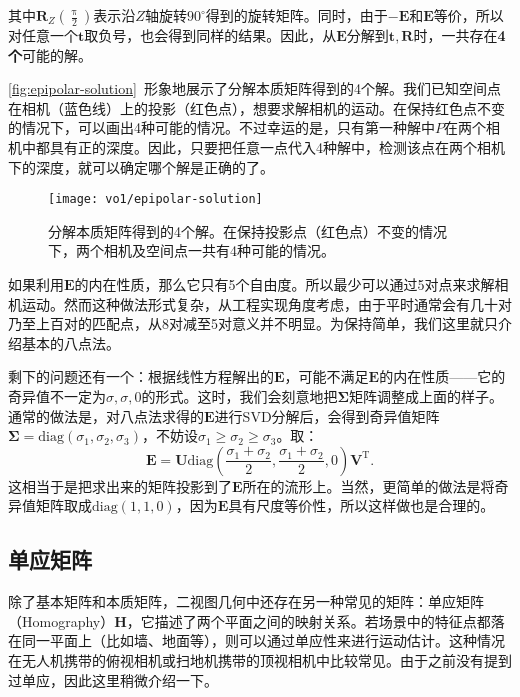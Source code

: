 其中$\bm{R}_Z(\frac{\uppi }{2})$表示沿$Z$轴旋转$90^\circ$得到的旋转矩阵。同时，由于$-\bm{E}$和$\bm{E}$等价，所以对任意一个$\bm{t}$取负号，也会得到同样的结果。因此，从$\bm{E}$分解到$\bm{t}, \bm{R}$时，一共存在\textbf{4个}可能的解。

\autoref{fig:epipolar-solution}~形象地展示了分解本质矩阵得到的4个解。我们已知空间点在相机（蓝色线）上的投影（红色点），想要求解相机的运动。在保持红色点不变的情况下，可以画出4种可能的情况。不过幸运的是，只有第一种解中$P$在两个相机中都具有正的深度。因此，只要把任意一点代入4种解中，检测该点在两个相机下的深度，就可以确定哪个解是正确的了。

\begin{figure}[!htp]
	\centering
	\texttt{[image: vo1/epipolar-solution]}
	\caption{分解本质矩阵得到的4个解。在保持投影点（红色点）不变的情况下，两个相机及空间点一共有4种可能的情况。}
	\label{fig:epipolar-solution}
\end{figure}

如果利用$\bm{E}$的内在性质，那么它只有5个自由度。所以最少可以通过5对点来求解相机运动\textsuperscript{\cite{Li2006, Nister2004a}}。然而这种做法形式复杂，从工程实现角度考虑，由于平时通常会有几十对乃至上百对的匹配点，从8对减至5对意义并不明显。为保持简单，我们这里就只介绍基本的八点法。

剩下的问题还有一个：根据线性方程解出的$\bm{E}$，可能不满足$\bm{E}$的内在性质——它的奇异值不一定为${\sigma}, {\sigma}, 0$的形式。这时，我们会刻意地把$\bm{\Sigma}$矩阵调整成上面的样子。通常的做法是，对八点法求得的$\bm{E}$进行SVD分解后，会得到奇异值矩阵$\bm{\Sigma} =  \mathrm{diag} ( \sigma_1, \sigma_2, \sigma_3)$，不妨设$\sigma_1 \geqslant \sigma_2 \geqslant \sigma_3$。取：
\begin{equation}
\bm{E} = \bm{U} \mathrm{diag} (\frac{\sigma_1+\sigma_2}{2}, \frac{\sigma_1+\sigma_2}{2}, 0) \bm{V}^\mathrm{T}.
\end{equation}
这相当于是把求出来的矩阵投影到了$\bm{E}$所在的流形上。当然，更简单的做法是将奇异值矩阵取成$\mathrm{diag} (1,1,0)$，因为$\bm{E}$具有尺度等价性，所以这样做也是合理的。

\subsection{单应矩阵}
除了基本矩阵和本质矩阵，二视图几何中还存在另一种常见的矩阵：单应矩阵（Homography）$\bm{H}$，它描述了两个平面之间的映射关系。若场景中的特征点都落在同一平面上（比如墙、地面等），则可以通过单应性来进行运动估计。这种情况在无人机携带的俯视相机或扫地机携带的顶视相机中比较常见。由于之前没有提到过单应，因此这里稍微介绍一下。

